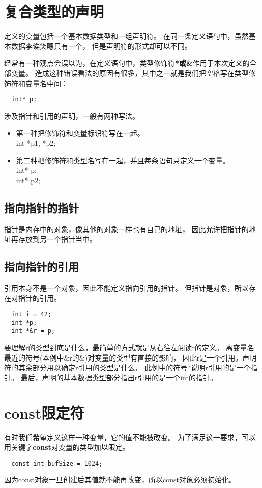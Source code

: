 \section{复合类型的声明}
定义的变量包括一个基本数据类型和一组声明符。%
在同一条定义语句中，虽然基本数据李诶笑嗯只有一个，%
但是声明符的形式却可以不同。%
\par
经常有一种观点会误以为，在定义语句中，类型修饰符{\bfseries{*或\&}}作用于本次定义的全部变量。%
造成这种错误看法的原因有很多，其中之一就是我们把空格写在类型修饰符和变量名中间：
\begin{lstlisting}
  int* p;
\end{lstlisting}
涉及指针和引用的声明，一般有两种写法。
\begin{itemize}
\item{第一种把修饰符和变量标识符写在一起。\\
    int *p1, *p2;
  }
\item{第二种把修饰符和类型名写在一起，并且每条语句只定义一个变量。\\
    int* p;\\
    int* p2;
  }
\end{itemize}
\subsection{指向指针的指针}
指针是内存中的对象，像其他的对象一样也有自己的地址，%
因此允许把指针的地址再存放到另一个指针当中。%
\subsection{指向指针的引用}
引用本身不是一个对象，因此不能定义指向引用的指针。%
但指针是对象，所以存在对指针的引用。
\begin{lstlisting}
  int i = 42;
  int *p;
  int *&r = p;
\end{lstlisting}
\par
{\color{red}要理解r的类型到底是什么，最简单的方式就是从右往左阅读r的定义。%
  离变量名最近的符号(本例中\&r的\&)对变量的类型有直接的影响，%
  因此r是一个引用。声明符的其余部分用以确定r引用的类型是什么，%
  此例中的符号*说明r引用的是一个指针。%
  最后，声明的基本数据类型部分指出r引用的是一个int的指针。
}

\section{const限定符}
有时我们希望定义这样一种变量，它的值不能被改变。%
为了满足这一要求，可以用关键字{\bfseries{const}}对变量的类型加以限定。%
\begin{lstlisting}
  const int bufSize = 1024;
\end{lstlisting}
因为const对象一旦创建后其值就不能再改变，所以const对象必须初始化。%
